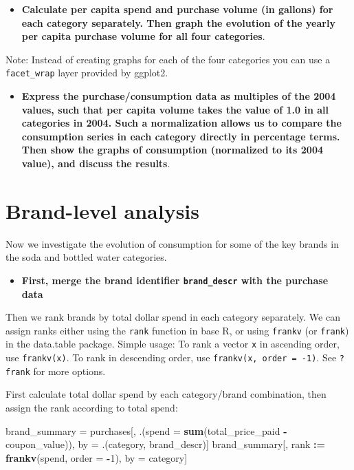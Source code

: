 \documentclass[
]{article}
\newenvironment{Shaded}{\begin{snugshade}}{\end{snugshade}}
\newcommand{\AttributeTok}[1]{\textcolor[rgb]{0.13,0.29,0.53}{#1}}
\newcommand{\DecValTok}[1]{\textcolor[rgb]{0.00,0.00,0.81}{#1}}
\newcommand{\FunctionTok}[1]{\textcolor[rgb]{0.13,0.29,0.53}{\textbf{#1}}}
\newcommand{\NormalTok}[1]{#1}
\newcommand{\OtherTok}[1]{\textcolor[rgb]{0.56,0.35,0.01}{#1}}
\newcommand{\SpecialCharTok}[1]{\textcolor[rgb]{0.81,0.36,0.00}{\textbf{#1}}}
\providecommand{\tightlist}{%
  \setlength{\itemsep}{0pt}\setlength{\parskip}{0pt}}
\begin{document}
\begin{itemize}
\tightlist
\item
  \textbf{Calculate per capita spend and purchase volume (in gallons)
  for each category separately. Then graph the evolution of the yearly
  per capita purchase volume for all four categories}.
\end{itemize}

Note: Instead of creating graphs for each of the four categories you can
use a \texttt{facet\_wrap} layer provided by ggplot2.

\begin{itemize}
\tightlist
\item
  \textbf{Express the purchase/consumption data as multiples of the 2004
  values, such that per capita volume takes the value of 1.0 in all
  categories in 2004. Such a normalization allows us to compare the
  consumption series in each category directly in percentage terms. Then
  show the graphs of consumption (normalized to its 2004 value), and
  discuss the results}.
\end{itemize}

\newpage

\section{Brand-level analysis}\label{brand-level-analysis}

Now we investigate the evolution of consumption for some of the key
brands in the soda and bottled water categories.

\begin{itemize}
\tightlist
\item
  \textbf{First, merge the brand identifier \texttt{brand\_descr} with
  the purchase data}
\end{itemize}

Then we rank brands by total dollar spend in each category separately.
We can assign ranks either using the \texttt{rank} function in base R,
or using \texttt{frankv} (or \texttt{frank}) in the data.table package.
Simple usage: To rank a vector \texttt{x} in ascending order, use
\texttt{frankv(x)}. To rank in descending order, use
\texttt{frankv(x,\ order\ =\ -1)}. See \texttt{?frank} for more options.

First calculate total dollar spend by each category/brand combination,
then assign the rank according to total spend:

\begin{Shaded}
\begin{Highlighting}[]
\NormalTok{brand\_summary }\OtherTok{=}\NormalTok{ purchases[, .(}\AttributeTok{spend =} \FunctionTok{sum}\NormalTok{(total\_price\_paid }\SpecialCharTok{{-}}\NormalTok{ coupon\_value)),}
\NormalTok{                            by }\OtherTok{=}\NormalTok{ .(category, brand\_descr)]}
\NormalTok{brand\_summary[, rank }\SpecialCharTok{:=} \FunctionTok{frankv}\NormalTok{(spend, }\AttributeTok{order =} \SpecialCharTok{{-}}\DecValTok{1}\NormalTok{), by }\OtherTok{=}\NormalTok{ category]}
\end{Highlighting}
\end{Shaded}
\end{document}
